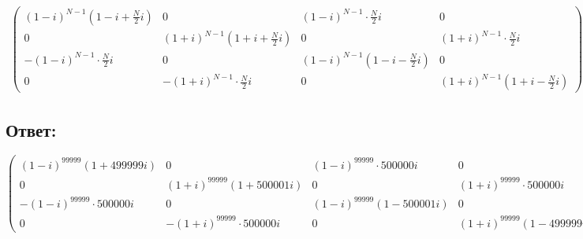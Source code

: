 \documentclass[12pt]{article}
\begin{document}
\begin{multline*}
\begin{pmatrix}
        ( 1 - i )
            ^{N-1} \left ( 1 - i + \frac{N}{2} i \right ) & 0                                                      & ( 1 - i )^{N-1} \cdot \frac{N}{2} i               & 0                                                 \\
            0                                             & ( 1 + i )^{N-1} \left ( 1 + i + \frac{N}{2} i \right ) & 0                                                      & ( 1 + i )^{N-1} \cdot \frac{N}{2} i                    \\
            - ( 1 - i )^{N-1} \cdot \frac{N}{2} i         & 0                                                      & ( 1 - i )^{N-1} \left ( 1 - i - \frac{N}{2} i \right ) & 0                                   \\
            0                                             & - ( 1 + i )^{N-1} \cdot \frac{N}{2} i                  & 0                                                      & ( 1 + i )^{N-1} \left ( 1 + i - \frac{N}{2} i \right )
        \end{pmatrix}.
    \end{multline*}

    \subsection*{Ответ:}
    \[
        \begin{pmatrix}
        ( 1 - i )
            ^{99999} \left ( 1 + 499999 i \right ) & 0                                               & ( 1 - i )^{99999} \cdot 500000 i                & 0                                               \\
            0                                      & ( 1 + i )^{99999} \left ( 1 + 500001 i \right ) & 0                                               & ( 1 + i )^{99999} \cdot 500000 i                \\
            - ( 1 - i )^{99999} \cdot 500000 i     & 0                                               & ( 1 - i )^{99999} \left ( 1 - 500001 i \right ) & 0                                   \\
            0                                      & - ( 1 + i )^{99999} \cdot 500000 i              & 0                                               & ( 1 + i )^{99999} \left ( 1 - 499999 i \right )
        \end{pmatrix}.
    \]
\end{document}
